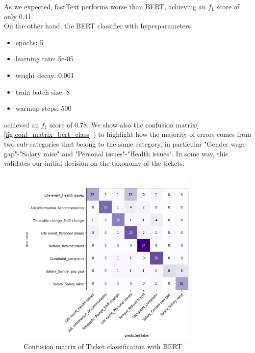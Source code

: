 As we expected, fastText performs worse than BERT, achieving an $f_1$ score of only 0.41. \\
On the other hand, the BERT classifier with hyperparameters\begin{itemize}
  \item epochs: 5
  \item learning rate: 5e-05
  \item weight decay: 0.001
  \item train batch size: 8
  \item warmup steps: 500
\end{itemize}
achieved an $f_1$ score of 0.78. We show also the confusion matrix( \autoref{fig:conf_matrix_bert_class} ) to highlight how the majority of errors comes from two sub-categories that belong to the same category, in particular "Gender wage gap"-"Salary raise" and "Personal issues"-"Health issues". In some way, this validates our initial decision on the taxonomy of the tickets.
\begin{figure}[h] 
  \centering
  \includegraphics[width=0.8\textwidth]{images/conf_matrix_bert_class.png}
  \caption{Confusion matrix of Ticket classification with BERT}
  \label{fig:conf_matrix_bert_class}
\end{figure}    
